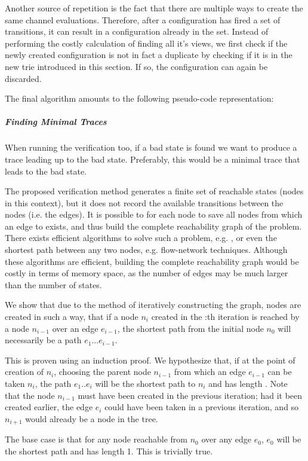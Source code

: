 Another source of repetition is the fact that there are multiple ways to create the same channel evaluations. Therefore, after a configuration has fired a set of transitions, it can result in a configuration already in the set. Instead of performing the costly calculation of finding all it's views, we first check if the newly created configuration is not in fact a duplicate by checking if it is in the new trie introduced in this section. If so, the configuration can again be discarded.

The final algorithm amounts to the following pseudo-code representation:

\subparagraph{Finding Minimal Traces}
When running the verification too, if a bad state is found we want to produce a trace leading up to the bad state. Preferably, this would be a minimal trace that leads to the bad state.
 
The proposed verification method generates a finite set of reachable states (nodes in this context), but it does not record the available transitions between the nodes (i.e. the edges). It is possible to for each node  to save all nodes  from which an edge to  exists, and thus build the complete reachability graph of the problem. There exists efficient algorithms to solve such a problem, e.g. , or even the shortest path between any two nodes, e.g. flow-network techniques. Although these algorithms are efficient, building the complete reachability graph would be costly in terms of memory space, as the number of edges may be much larger than the number of states.

 
We show that due to the method of iteratively constructing the graph, nodes are created in such a way, that if a node $n_{i}$ created in the :th iteration is reached by a node $n_{i-1}$ over an edge $e_{i-1}$, the shortest path from the initial node $n_0$ will necessarily be a path $e_1...e_{i-1}$.
 
 This is proven using an induction proof. We hypothesize that, if at the point of creation of $n_i$, choosing the parent node $n_{i-1}$ from which an edge $e_{i-1}$ can be taken $n_i$, the path $e_1..e_{i}$ will be the shortest path to $n_i$ and has length . Note that the node $n_{i-1}$ must have been created in the previous iteration; had it been created earlier, the edge $e_i$ could have been taken in a previous iteration, and so $n_{i+1}$ would already be a node in the tree.
 
The base case is that for any node reachable from $n_0$ over any edge $e_0$, $e_0$ will be the shortest path and has length 1. This is trivially true.
 
